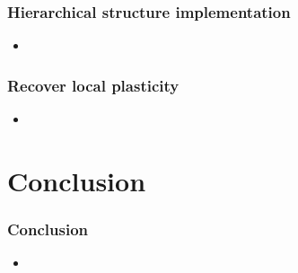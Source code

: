 \documentclass[aspectratio=43]{beamer}
\begin{document}
\begin{frame}
  \frametitle{Hierarchical structure implementation}
  \begin{itemize}
    \item %
  \end{itemize}
\end{frame}

\begin{frame}
  \frametitle{Recover local plasticity}
  \begin{itemize}
    \item %
  \end{itemize}
\end{frame}




\section{Conclusion}
\begin{frame}
  \frametitle{Conclusion}
  \begin{itemize}
    \item %
  \end{itemize}
\end{frame}
\end{document}

